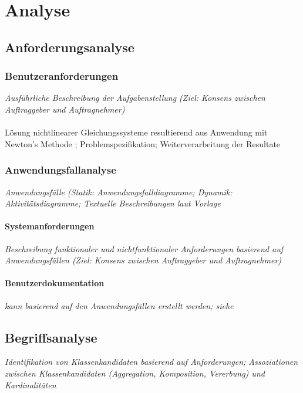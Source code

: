 \chapter{Analyse}
\label{ch:2}

\section{Anforderungsanalyse}
\label{sec:2.1}

\subsection{Benutzeranforderungen}

{\em Ausf\"uhrliche Beschreibung der Aufgabenstellung (Ziel: Konsens zwischen
Auftraggeber und Auftragnehmer)} \\
\\
L\"osung nichtlinearer Gleichungssysteme resultierend aus Anwendung
mit Newton's Methode \cite{Heath1998SCA,Kelley2003SNE};
Problemspezifikation; Weiterverarbeitung der Resultate

\subsection{Anwendungsfallanalyse}

{\em Anwendungsf\"alle (Statik: Anwendungsfalldiagramme; Dynamik: 
Aktivit\"atsdiagramme; Textuelle Beschreibungen laut Vorlage}

\subsubsection{Systemanforderungen}

{\em Beschreibung funktionaler und nichtfunktionaler Anforderungen basierend
auf Anwendungsf\"allen (Ziel: Konsens zwischen Auftraggeber und Auftragnehmer)}

\subsubsection{Benutzerdokumentation}

{\em kann basierend auf den Anwendungsf\"allen erstellt werden; siehe
}

\section{Begriffsanalyse}

{\em Identifikation von Klassenkandidaten basierend auf Anforderungen;
Assoziationen zwischen Klassenkandidaten (Aggregation, Komposition, Vererbung)
und Kardinalit\"aten}


